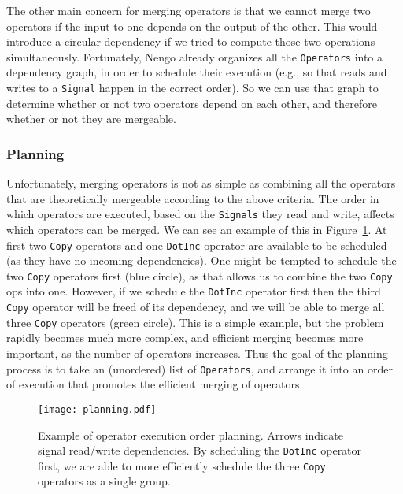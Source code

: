 \documentclass{article}
\begin{document}
The other main concern for merging operators is that we cannot merge two operators if the input to one depends on the output of the other.  This would introduce a circular dependency if we tried to compute those two operations simultaneously.  Fortunately, Nengo already organizes all the \texttt{Operators} into a dependency graph, in order to schedule their execution (e.g., so that reads and writes to a \texttt{Signal} happen in the correct order).  So we can use that graph to determine whether or not two operators depend on each other, and therefore whether or not they are mergeable.

\subsubsection{Planning}

Unfortunately, merging operators is not as simple as combining all the operators that are theoretically mergeable according to the above criteria.  The order in which operators are executed, based on the \texttt{Signals} they read and write, affects which operators can be merged.  We can see an example of this in Figure~\ref{fig:planning}.  At first two \texttt{Copy} operators and one \texttt{DotInc} operator are available to be scheduled (as they have no incoming dependencies).  One might be tempted to schedule the two \texttt{Copy} operators first (blue circle), as that allows us to combine the two \texttt{Copy} ops into one.  However, if we schedule the \texttt{DotInc} operator first then the third \texttt{Copy} operator will be freed of its dependency, and we will be able to merge all three \texttt{Copy} operators (green circle).  This is a simple example, but the problem rapidly becomes much more complex, and efficient merging becomes more important, as the number of operators increases.  Thus the goal of the planning process is to take an (unordered) list of \texttt{Operators}, and arrange it into an order of execution that promotes the efficient merging of operators.

\begin{figure}
\centering
\texttt{[image: planning.pdf]}
\caption{Example of operator execution order planning.  Arrows indicate signal read/write dependencies.  By scheduling the \texttt{DotInc} operator first, we are able to more efficiently schedule the three \texttt{Copy} operators as a single group.}
\label{fig:planning}
\end{figure}
\end{document}
